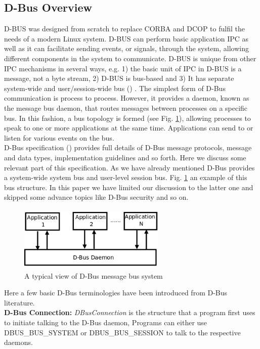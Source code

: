 \documentclass{ifacconf}
\begin{document}
\subsection{D-Bus Overview}
D-BUS was designed from scratch to replace CORBA and DCOP  to fulfil the needs of a modern Linux system. D-BUS can perform basic application IPC as well as it can facilitate sending events, or signals, through the system, allowing different components in the system to communicate. D-BUS is unique from other IPC mechanisms in several ways, e.g. 1) the basic unit of IPC in D-BUS is a message, not a byte stream, 2) D-BUS is bus-based and 3) It has separate system-wide and user/session-wide bus (\cite{Love2005}) . The simplest form of D-Bus communication is process to process. However, it provides a daemon, known as the message bus daemon, that routes messages between processes on a specific bus. In this fashion, a bus topology is formed (see Fig. \ref{fig:dbus-daemon}), allowing processes to speak to one or more applications at the same time. Applications can send to or listen for various events on the bus.\\
D-Bus specification (\cite{Pennington+2010}) provides full details of D-Bus message protocols, message and data types, implementation guidelines and so forth. Here we discuss some relevant part of this specification. As we have already mentioned D-Bus provides a system-wide system bus and user-level session bus. Fig. \ref{fig:dbus-daemon} an example of this bus structure. In this paper we have limited our discussion to the latter one and skipped some advance topics like D-Bus security and so on.
\begin{figure}
\begin{center}
\includegraphics[width=7cm,height=3.1cm]{./dia-files/dbus-daemon} %
\caption{A typical view of D-Bus message bus system } 
\label{fig:dbus-daemon}
\end{center}
\end{figure}
Here a few basic D-Bus terminologies have been introduced from D-Bus literature.\\
\textbf{D-Bus Connection: }
\textit{DBusConnection} is the structure that a program first uses to initiate talking to the D-Bus daemon, Programs can either use DBUS\_BUS\_SYSTEM or DBUS\_BUS\_SESSION to talk to the respective daemons.\\
\end{document}
